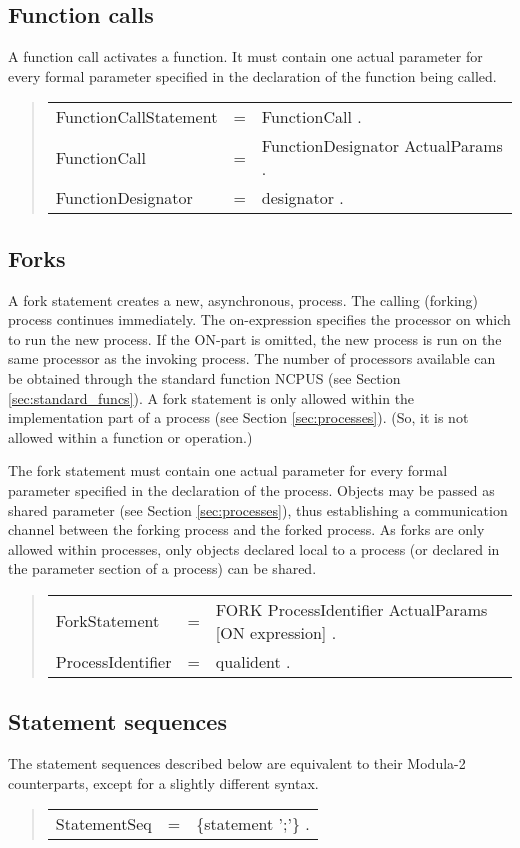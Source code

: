 \documentclass[10pt]{article}
\newenvironment{grammar}
{\begin{quote} \begin{tabular}{p{3.8cm} l l}}
{\end{tabular}\end{quote}}
\begin{document}
\subsection{Function calls}

A function call activates a function.
It must contain one actual parameter for every formal parameter specified
in the declaration of the function being called.
\begin{grammar}
FunctionCallStatement & = & FunctionCall . \\
FunctionCall & = & FunctionDesignator ActualParams . \\
FunctionDesignator & = & designator .
\end{grammar}
\subsection{Forks}

A fork statement creates a new, asynchronous, process.
The calling (forking) process continues immediately.
The on-expression specifies the processor on which to run the new process.
If the ON-part is omitted, the new process is run on the same
processor as the invoking process.
The number of processors available can be obtained through the
standard function NCPUS (see Section \ref{sec:standard_funcs}).
A fork statement is only allowed within the implementation
part of a process (see Section \ref{sec:processes}).
(So, it is not allowed within a function or operation.)

The fork statement must contain one actual parameter for every
formal parameter specified in the declaration of the process.
Objects may be passed as shared parameter (see Section \ref{sec:processes}),
thus establishing a communication channel between the forking process and the
forked process.
As forks are only allowed within processes, only objects declared
local to a process (or declared in the parameter section of a process)
can be shared.
\begin{grammar}
ForkStatement & = & FORK ProcessIdentifier ActualParams [ON expression] . \\
ProcessIdentifier & = & qualident .
\end{grammar}
\subsection{Statement sequences}

The statement sequences described below are equivalent to their
Modula-2 counterparts, except for a slightly different syntax.
\begin{grammar}
StatementSeq & = & \{statement ';'\} .
\end{grammar}
\end{document}
